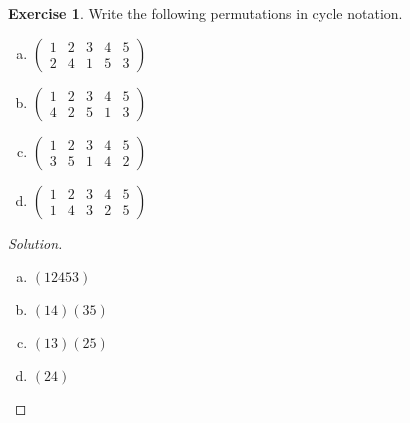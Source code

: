\documentclass{article}
\theoremstyle{definition}
\newtheorem{theorem}{Exercise}[section]
\theoremstyle{remark}
\begin{document}
	\setcounter{section}{5}
	\setcounter{theorem}{0}
	\begin{theorem}
		Write the following permutations in cycle notation.
		\begin{multicols}{4}
		\begin{enumerate}[(a)]
			\item $
			\begin{pmatrix}
			1 & 2 & 3 & 4 & 5 \\ 
			2 & 4 & 1 & 5 & 3
			\end{pmatrix} $
			\item $
			\begin{pmatrix}
			1 & 2 & 3 & 4 & 5 \\ 
			4 & 2 & 5 & 1 & 3
			\end{pmatrix} $
			\item $\begin{pmatrix}
			1 & 2 & 3 & 4 & 5 \\ 
			3 & 5 & 1 & 4 & 2
			\end{pmatrix} $
			\item $\begin{pmatrix}
			1 & 2 & 3 & 4 & 5 \\ 
			1 & 4 & 3 & 2 & 5
			\end{pmatrix} $
		\end{enumerate}

		\end{multicols}
	\end{theorem}
	\begin{proof}[Solution]\hfill
		\begin{multicols}{4}
		\begin{enumerate}[(a)]
			\item $\left(12453\right)$
			\item $\left(14\right)\left(35\right)$
			\item $\left(13\right)\left(25\right)$
			\item $\left(24\right)$\qedhere
		\end{enumerate}\noindent
		\end{multicols}\noindent
	\end{proof}
	
	
	
\end{document}
